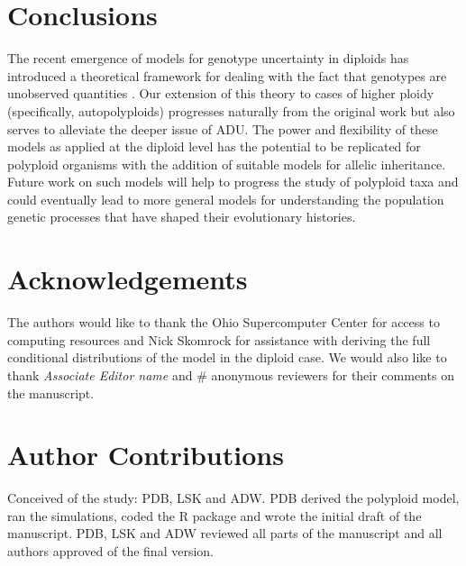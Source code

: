 \documentclass[11pt,english,letterpaper,oneside]{article}
\begin{document}
\section*{Conclusions}      %

The recent emergence of models for genotype uncertainty in diploids has introduced a theoretical framework for dealing with the fact that genotypes are unobserved quantities \citep{gompert2012bgc,buerkle2013popModels}. Our extension of this theory to cases of higher ploidy (specifically, autopolyploids) progresses naturally from the original work but also serves to alleviate the deeper issue of ADU. The power and flexibility of these models as applied at the diploid level has the potential to be replicated for polyploid organisms with the addition of suitable models for allelic inheritance. Future work on such models will help to progress the study of polyploid taxa and could eventually lead to more general models for understanding the population genetic processes that have shaped their evolutionary histories.
\medskip

\section*{Acknowledgements}           %

The authors would like to thank the Ohio Supercomputer Center for access to computing resources and Nick Skomrock for assistance with deriving the full conditional distributions of the model in the diploid case. We would also like to thank \textit{Associate Editor name} and \# anonymous reviewers for their comments on the manuscript.
\medskip



\singlespacing




\doublespacing

\section*{Author Contributions}        %

Conceived of the study: PDB, LSK and ADW. PDB derived the polyploid model, ran the simulations, coded the R package and wrote the initial draft of the manuscript. PDB, LSK and ADW reviewed all parts of the manuscript and all authors approved of the final version.
\medskip
\end{document}
